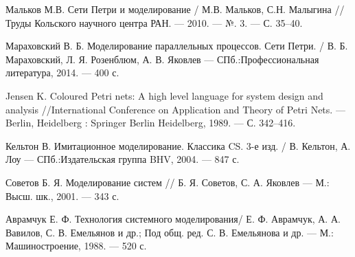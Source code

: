 \begin{thebibliography}{}
 Мальков М.В. Сети Петри и моделирование / М.В. Мальков, С.Н. Малыгина // Труды Кольского научного центра РАН. --- 2010. --- №. 3. --- С. 35--40.

 Мараховский В. Б. Моделирование параллельных процессов. Сети Петри. / В. Б. Мараховский, Л. Я. Розенблюм,  А. В. Яковлев --- СПб.:Профессиональная литература, 2014. --- 400 с.

 Jensen K. Coloured Petri nets: A high level language for system design and analysis //International Conference on Application and Theory of Petri Nets. --- Berlin, Heidelberg : Springer Berlin Heidelberg, 1989. --- С. 342--416.

 Кельтон В. Имитационное моделирование. Классика CS. 3-е изд. / В. Кельтон, А. Лоу --- СПб.:Издательская группа BHV, 2004. --- 847 с.

 Советов Б. Я. Моделирование систем //  Б. Я. Советов, С. А. Яковлев --- М.: Высш. шк., 2001. --- 343 с.

 Аврамчук Е. Ф. Технология системного моделирования/ Е. Ф. Аврамчук, А. А. Вавилов, С. В. Емельянов и др.; Под общ. ред. С. В. Емельянова и др. — М.: Машиностроение, 1988. --- 520 с.

\end{thebibliography}